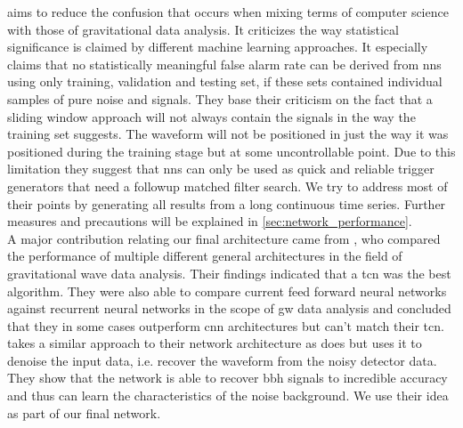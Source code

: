 \cite{cnn_magiacal_bullet} aims to reduce the confusion that occurs when mixing terms of computer science with those of gravitational data analysis. It criticizes the way statistical significance is claimed by different machine learning approaches. It especially claims that no statistically meaningful false alarm rate can be derived from \gls{nn}s using only training, validation and testing set, if these sets contained individual samples of pure noise and signals. They base their criticism on the fact that a sliding window approach will not always contain the signals in the way the training set suggests. The waveform will not be positioned in just the way it was positioned during the training stage but at some uncontrollable point. Due to this limitation they suggest that \gls{nn}s can only be used as quick and reliable trigger generators that need a followup matched filter search. We try to address most of their points by generating all results from a long continuous time series. Further measures and precautions will be explained in \autoref{sec:network_performance}.\\
A major contribution relating our final architecture came from \cite{tcn_idea}, who compared the performance of multiple different general architectures in the field of gravitational wave data analysis. Their findings indicated that a \gls{tcn} was the best algorithm. They were also able to compare current feed forward neural networks against recurrent neural networks in the scope of \gls{gw} data analysis and concluded that they in some cases outperform \gls{cnn} architectures but can't match their \gls{tcn}.\\
\cite{dnn_denoising} takes a similar approach to their network architecture as \cite{tcn_idea} does but uses it to denoise the input data, i.e. recover the waveform from the noisy detector data. They show that the network is able to recover \gls{bbh} signals to incredible accuracy and thus can learn the characteristics of the noise background. We use their idea as part of our final network.